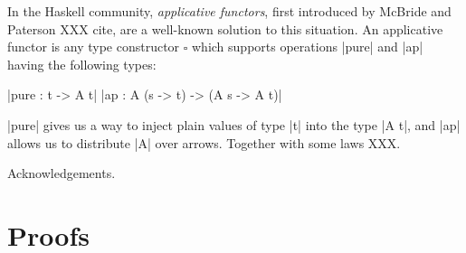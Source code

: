 \documentclass[sigplan,screen]{acmart}
\newcommand{\term}[1]{\emph{#1}}
\begin{document}
In the Haskell community, \term{applicative functors}, first
introduced by McBride and Paterson XXX cite, are a well-known
solution to this situation.  An applicative functor is any type
constructor $\square$ which supports operations |pure| and |ap| having
the following types:

|pure : t -> A t|
|ap : A (s -> t) -> (A s -> A t)|

|pure| gives us a way to inject plain values of type |t| into the type
|A t|, and |ap| allows us to distribute |A| over arrows.  Together
with some laws XXX.






\begin{acks}
Acknowledgements.
\end{acks}




\appendix

\section{Proofs}
\end{document}
